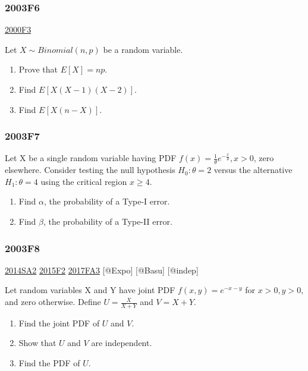 \documentclass[6pt,Portrait]{article}
\begin{document}
\hypertarget{f6-1}{%
\subsubsection{2003F6}\label{f6-1}}

\protect\hyperlink{f3}{2000F3}

Let \(X\sim Binomial(n,p)\) be a random variable.

\begin{enumerate}
\def\labelenumi{\Alph{enumi})}
\item
  Prove that \(E[X]=np\).
\item
  Find \(E[X(X-1)(X-2)]\).
\item
  Find \(E[X(n-X)]\).
\end{enumerate}

\hypertarget{f7-1}{%
\subsubsection{2003F7}\label{f7-1}}

Let X be a single random variable having PDF
\(f(x)=\frac1{\theta}e^{-\frac{x}{\theta}},x>0\), zero elsewhere.
Consider testing the null hypothesis \(H_0:\theta=2\) versus the
alternative \(H_1:\theta=4\) using the critical region \(x\ge4\).

\begin{enumerate}
\def\labelenumi{\Alph{enumi})}
\item
  Find \(\alpha\), the probability of a Type-I error.
\item
  Find \(\beta\), the probability of a Type-II error.
\end{enumerate}

\hypertarget{f8-1}{%
\subsubsection{2003F8}\label{f8-1}}

\protect\hyperlink{sa2-2}{2014SA2} \protect\hyperlink{f2-5}{2015F2}
\protect\hyperlink{fa3-3}{2017FA3} {[}@Expo{]} {[}@Basu{]} {[}@indep{]}

Let random variables X and Y have joint PDF \(f(x,y)=e^{-x-y}\) for
\(x>0,y>0\), and zero otherwise. Define \(U=\frac{X}{X+Y}\) and
\(V =X+Y\).

\begin{enumerate}
\def\labelenumi{\Alph{enumi})}
\item
  Find the joint PDF of \(U\) and \(V\).
\item
  Show that \(U\) and \(V\) are independent.
\item
  Find the PDF of \(U\).
\end{enumerate}
\end{document}
